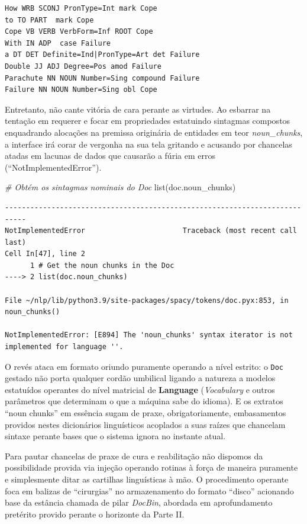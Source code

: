 \documentclass[
  brazilian,
]{article}
\newenvironment{Shaded}{}{}
\newcommand{\BuiltInTok}[1]{#1}
\newcommand{\CommentTok}[1]{\textcolor[rgb]{0.38,0.63,0.69}{\textit{#1}}}
\newcommand{\NormalTok}[1]{#1}
\begin{document}
\begin{verbatim}
How WRB SCONJ PronType=Int mark Cope
to TO PART  mark Cope
Cope VB VERB VerbForm=Inf ROOT Cope
With IN ADP  case Failure
a DT DET Definite=Ind|PronType=Art det Failure
Double JJ ADJ Degree=Pos amod Failure
Parachute NN NOUN Number=Sing compound Failure
Failure NN NOUN Number=Sing obl Cope
\end{verbatim}

Entretanto, não cante vitória de cara perante as virtudes. Ao esbarrar
na tentação em requerer e focar em propriedades estatuindo sintagmas
compostos enquadrando alocações na premissa originária de entidades em
teor \emph{noun\_chunks}, a interface irá corar de vergonha na sua tela
gritando e acusando por chancelas atadas em lacunas de dados que
causarão a fúria em erros (``NotImplementedError'').

\begin{Shaded}
\begin{Highlighting}[]
\CommentTok{\# Obtém os sintagmas nominais do Doc}
\BuiltInTok{list}\NormalTok{(doc.noun\_chunks)}
\end{Highlighting}
\end{Shaded}

\begin{verbatim}
---------------------------------------------------------------------------
NotImplementedError                       Traceback (most recent call last)
Cell In[47], line 2
      1 # Get the noun chunks in the Doc
----> 2 list(doc.noun_chunks)

File ~/nlp/lib/python3.9/site-packages/spacy/tokens/doc.pyx:853, in noun_chunks()

NotImplementedError: [E894] The 'noun_chunks' syntax iterator is not implemented for language ''.
\end{verbatim}

O revés ataca em formato oriundo puramente operando a nível estrito: o
\texttt{Doc} gestado não porta qualquer cordão umbilical ligando a
natureza a modelos estatuídos operantes do nível matricial de
\textbf{Language} (\emph{Vocabulary} e outros parâmetros que determinam
o que a máquina sabe do idioma). E os extratos ``noun chunks'' em
essência sugam de praxe, obrigatoriamente, embasamentos providos nestes
dicionários linguísticos acoplados a suas raízes que chancelam sintaxe
perante bases que o sistema ignora no instante atual.

Para pautar chancelas de praxe de cura e reabilitação não dispomos da
possibilidade provida via injeção operando rotinas à força de maneira
puramente e simplesmente ditar as cartilhas linguísticas à mão. O
procedimento operante foca em balizas de ``cirurgias'' no armazenamento
do formato ``disco'' acionando base da estância chamada de pilar
\emph{DocBin}, abordada em aprofundamento pretérito provido perante o
horizonte da Parte II.
\end{document}
